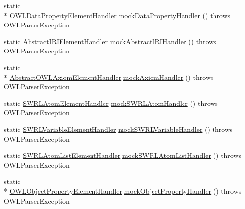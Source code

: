 \begin{DoxyCompactItemize}
\item 
static \\*
\hyperlink{classorg_1_1coode_1_1owlapi_1_1owlxmlparser_1_1_o_w_l_data_property_element_handler}{O\-W\-L\-Data\-Property\-Element\-Handler} \hyperlink{classorg_1_1semanticweb_1_1owlapi_1_1contract_1_1_utils_aee8678ab9e64aa5a234f96be74d519c5}{mock\-Data\-Property\-Handler} ()  throws O\-W\-L\-Parser\-Exception 
\item 
static \hyperlink{classorg_1_1coode_1_1owlapi_1_1owlxmlparser_1_1_abstract_i_r_i_element_handler}{Abstract\-I\-R\-I\-Element\-Handler} \hyperlink{classorg_1_1semanticweb_1_1owlapi_1_1contract_1_1_utils_a12575d11e4eeeea4aa7e564ef35c6192}{mock\-Abstract\-I\-R\-I\-Handler} ()  throws O\-W\-L\-Parser\-Exception 
\item 
static \\*
\hyperlink{classorg_1_1coode_1_1owlapi_1_1owlxmlparser_1_1_abstract_o_w_l_axiom_element_handler}{Abstract\-O\-W\-L\-Axiom\-Element\-Handler} \hyperlink{classorg_1_1semanticweb_1_1owlapi_1_1contract_1_1_utils_a655eb29708c5ebecb25aa4a5897999d1}{mock\-Axiom\-Handler} ()  throws O\-W\-L\-Parser\-Exception 
\item 
static \hyperlink{classorg_1_1coode_1_1owlapi_1_1owlxmlparser_1_1_s_w_r_l_atom_element_handler}{S\-W\-R\-L\-Atom\-Element\-Handler} \hyperlink{classorg_1_1semanticweb_1_1owlapi_1_1contract_1_1_utils_a8aaf6e0f66e433d12b87df251e57e13e}{mock\-S\-W\-R\-L\-Atom\-Handler} ()  throws O\-W\-L\-Parser\-Exception 
\item 
static \hyperlink{classorg_1_1coode_1_1owlapi_1_1owlxmlparser_1_1_s_w_r_l_variable_element_handler}{S\-W\-R\-L\-Variable\-Element\-Handler} \hyperlink{classorg_1_1semanticweb_1_1owlapi_1_1contract_1_1_utils_ab49acf746b4e7a2ac1209d1572614212}{mock\-S\-W\-R\-L\-Variable\-Handler} ()  throws O\-W\-L\-Parser\-Exception 
\item 
static \hyperlink{classorg_1_1coode_1_1owlapi_1_1owlxmlparser_1_1_s_w_r_l_atom_list_element_handler}{S\-W\-R\-L\-Atom\-List\-Element\-Handler} \hyperlink{classorg_1_1semanticweb_1_1owlapi_1_1contract_1_1_utils_ad82fb1c62aaf6fc4fc0430d012e7c6dd}{mock\-S\-W\-R\-L\-Atom\-List\-Handler} ()  throws O\-W\-L\-Parser\-Exception 
\item 
static \\*
\hyperlink{classorg_1_1coode_1_1owlapi_1_1owlxmlparser_1_1_o_w_l_object_property_element_handler}{O\-W\-L\-Object\-Property\-Element\-Handler} \hyperlink{classorg_1_1semanticweb_1_1owlapi_1_1contract_1_1_utils_ab045171cb053ae4f09a51287f1ed5035}{mock\-Object\-Property\-Handler} ()  throws O\-W\-L\-Parser\-Exception 

\end{DoxyCompactItemize}
